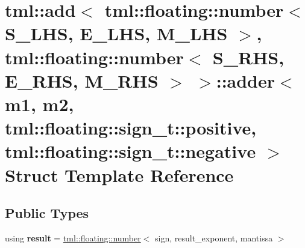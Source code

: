 \hypertarget{structtml_1_1add_3_01tml_1_1floating_1_1number_3_01_s___l_h_s_00_01_e___l_h_s_00_01_m___l_h_s_012f891e05bc1eb57b4be51c977e00b324}{\section{tml\+:\+:add$<$ tml\+:\+:floating\+:\+:number$<$ S\+\_\+\+L\+H\+S, E\+\_\+\+L\+H\+S, M\+\_\+\+L\+H\+S $>$, tml\+:\+:floating\+:\+:number$<$ S\+\_\+\+R\+H\+S, E\+\_\+\+R\+H\+S, M\+\_\+\+R\+H\+S $>$ $>$\+:\+:adder$<$ m1, m2, tml\+:\+:floating\+:\+:sign\+\_\+t\+:\+:positive, tml\+:\+:floating\+:\+:sign\+\_\+t\+:\+:negative $>$ Struct Template Reference}
\label{structtml_1_1add_3_01tml_1_1floating_1_1number_3_01_s___l_h_s_00_01_e___l_h_s_00_01_m___l_h_s_012f891e05bc1eb57b4be51c977e00b324}
}
\subsection*{Public Types}
\begin{DoxyCompactItemize}
\item 
\hypertarget{structtml_1_1add_3_01tml_1_1floating_1_1number_3_01_s___l_h_s_00_01_e___l_h_s_00_01_m___l_h_s_012f891e05bc1eb57b4be51c977e00b324_adf3b88a14c1ba1ad64271b1e45f67504}{using {\bfseries result} = \hyperlink{structtml_1_1floating_1_1number}{tml\+::floating\+::number}$<$ sign, result\+\_\+exponent, mantissa $>$}\label{structtml_1_1add_3_01tml_1_1floating_1_1number_3_01_s___l_h_s_00_01_e___l_h_s_00_01_m___l_h_s_012f891e05bc1eb57b4be51c977e00b324_adf3b88a14c1ba1ad64271b1e45f67504}

\end{DoxyCompactItemize}
